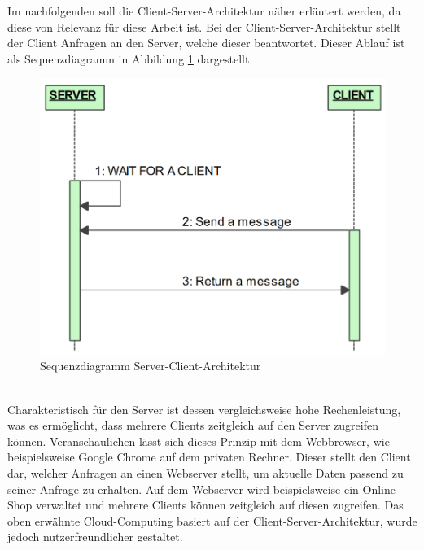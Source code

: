 \documentclass[ a4paper,
                oneside,
                toc=bibliography,
                toc=listof
                ]{scrbook}
\begin{document}
   	Im nachfolgenden soll die Client-Server-Architektur näher erläutert werden, da diese von Relevanz für diese Arbeit ist.
   	Bei der Client-Server-Architektur stellt der Client Anfragen an den Server, welche dieser beantwortet. Dieser Ablauf ist als Sequenzdiagramm in Abbildung \ref{fig:Sequenz Server-Client} dargestellt.\\
   	\begin{figure}[!ht]
   		\centering
   		\includegraphics[width=0.50\linewidth]{./images/Sequenzdiagramm_Server_Client.png}
   		\caption{Sequenzdiagramm Server-Client-Architektur \cite{CS9_TCP}} 
   		\label{fig:Sequenz Server-Client}
   	\end{figure} \\   	
   	Charakteristisch für den Server ist dessen vergleichsweise hohe Rechenleistung, was es ermöglicht, dass mehrere Clients zeitgleich auf den Server zugreifen können. Veranschaulichen lässt sich dieses Prinzip mit dem Webbrowser, wie beispielsweise Google Chrome auf dem privaten Rechner. Dieser stellt den Client dar, welcher Anfragen an einen Webserver stellt, um aktuelle Daten passend zu seiner Anfrage zu erhalten. Auf dem Webserver wird beispielsweise ein Online-Shop verwaltet und mehrere Clients können zeitgleich auf diesen zugreifen. Das oben erwähnte Cloud-Computing basiert auf der Client-Server-Architektur, wurde jedoch nutzerfreundlicher gestaltet. \cite{IT-Sicherheit}
   	\label{sec:TCP/IP}
   	
\end{document}
